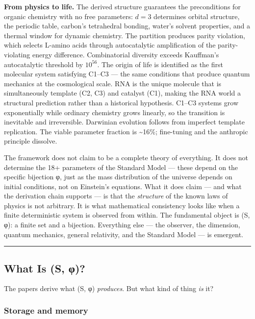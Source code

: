 \documentclass[
]{article}
\begin{document}
\textbf{From physics to life.} The derived structure guarantees the
preconditions for organic chemistry with no free parameters: \(d = 3\)
determines orbital structure, the periodic table, carbon's tetrahedral
bonding, water's solvent properties, and a thermal window for dynamic
chemistry. The partition produces parity violation, which selects
L-amino acids through autocatalytic amplification of the
parity-violating energy difference. Combinatorial diversity exceeds
Kauffman's autocatalytic threshold by \(10^{56}\). The origin of life is
identified as the first molecular system satisfying C1--C3 --- the same
conditions that produce quantum mechanics at the cosmological scale. RNA
is the unique molecule that is simultaneously template (C2, C3) and
catalyst (C1), making the RNA world a structural prediction rather than
a historical hypothesis. C1--C3 systems grow exponentially while
ordinary chemistry grows linearly, so the transition is inevitable and
irreversible. Darwinian evolution follows from imperfect template
replication. The viable parameter fraction is \textasciitilde16\%;
fine-tuning and the anthropic principle dissolve.

The framework does not claim to be a complete theory of everything. It
does not determine the 18+ parameters of the Standard Model --- these
depend on the specific bijection φ, just as the mass distribution of the
universe depends on initial conditions, not on Einstein's equations.
What it does claim --- and what the derivation chain supports --- is
that the \emph{structure} of the known laws of physics is not arbitrary.
It is what mathematical consistency looks like when a finite
deterministic system is observed from within. The fundamental object is
(S, φ): a finite set and a bijection. Everything else --- the observer,
the dimension, quantum mechanics, general relativity, and the Standard
Model --- is emergent.

\begin{center}\rule{0.5\linewidth}{0.5pt}\end{center}

\hypertarget{what-is-s-ux3c6}{%
\subsection{What Is (S, φ)?}\label{what-is-s-ux3c6}}

The papers derive what (S, φ) \emph{produces}. But what kind of thing
\emph{is} it?

\hypertarget{storage-and-memory}{%
\subsubsection{Storage and memory}\label{storage-and-memory}}
\end{document}
